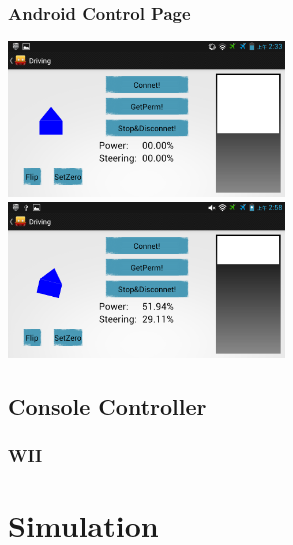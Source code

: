 \documentclass[pdf]{beamer}
\begin{document}
\begin{frame}
\frametitle{Android Control Page}
  \begin{center}
   \includegraphics[width = 0.55\textwidth]{pics/android_control.png}\\  
   \includegraphics[width = 0.55\textwidth]{pics/android_controlling.png}     
  \end{center}
\end{frame}

\subsection{Console Controller}
\begin{frame}
\frametitle{WII}
  \begin{center}
  \end{center}
\end{frame}


\section{Simulation}
\end{document}
